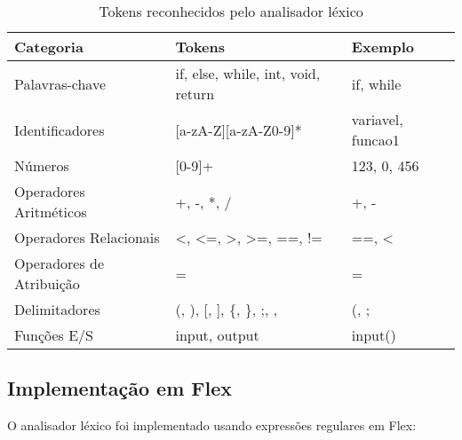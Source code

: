 \documentclass[
	12pt,				%
	oneside,
	a4paper,			%
	english,			%
	french,				%
	spanish,			%
	brazil,				%
	]{abntex2}
\begin{document}
\begin{table}[H]
\centering
\caption{Tokens reconhecidos pelo analisador léxico}
\begin{tabular}{|l|l|l|}
\hline
\textbf{Categoria} & \textbf{Tokens} & \textbf{Exemplo} \\
\hline
Palavras-chave & if, else, while, int, void, return & if, while \\
\hline
Identificadores & [a-zA-Z][a-zA-Z0-9]* & variavel, funcao1 \\
\hline
Números & [0-9]+ & 123, 0, 456 \\
\hline
Operadores Aritméticos & +, -, *, / & +, - \\
\hline
Operadores Relacionais & <, <=, >, >=, ==, != & ==, < \\  
\hline
Operadores de Atribuição & = & = \\
\hline
Delimitadores & (, ), [, ], \{, \}, ;, , & (, ; \\
\hline
Funções E/S & input, output & input() \\
\hline
\end{tabular}
\end{table}

\subsection{Implementação em Flex}

O analisador léxico foi implementado usando expressões regulares em Flex:
\end{document}
